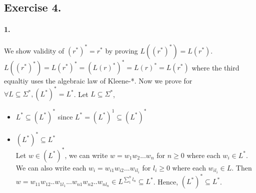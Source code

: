 \documentclass[12pt]{article}
\begin{document}
\subsection*{Exercise 4.}
\paragraph*{1.} We show validity of \((r^*)^* = r^*\) by proving \(L((r^*)^*) = L(r^*)\).\\
\(L((r^*)^*) = L(r^*)^* = (L(r)^*)^* = L(r)^* = L(r^*)\) where the third equaltiy uses the algebraic law of Kleene-*. Now we prove for \(\forall L \subseteq \Sigma^*, (L^*)^* = L^*\). Let \(L \subseteq \Sigma^*\),
\begin{itemize}
  \item \(L^* \subseteq (L^*)^*\) since \(L^* = (L^*)^1 \subseteq (L^*)^*\)
  \item \((L^*)^* \subseteq L^*\)\\
  Let \(w \in (L^*)^*\), we can write \(w = w_1w_2...w_n\) for \(n \geq 0\) where each \(w_i \in L^*\). We can also write each \(w_i = w_{i1}w_{i2}...w_{il_i}\) for \(l_i \geq 0\) where each \(w_{il_i} \in L\). Then \(w = w_{11}w_{12}..w_{1l_1}...w_{n1}w_{n2}..w_{nl_n} \in L^{\sum_1^n{l_n}} \subseteq L^*\). Hence, \((L^*)^* \subseteq L^*\). 
\end{itemize}
\end{document}
